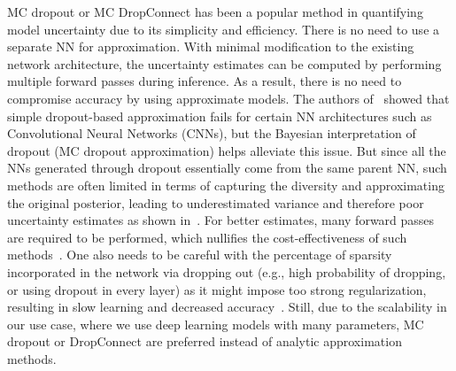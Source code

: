     MC dropout or MC DropConnect has been a popular method in quantifying model uncertainty due to its simplicity and efficiency. There is no need to use a separate NN for approximation. With minimal modification to the existing network architecture, the uncertainty estimates can be computed by performing multiple forward passes during inference. As a result, there is no need to compromise accuracy by using approximate models. The authors of~\cite{BayesCNN} showed that simple dropout-based approximation fails for certain NN architectures such as Convolutional Neural Networks (CNNs), but the Bayesian interpretation of dropout (MC dropout approximation) helps alleviate this issue. But since all the NNs generated through dropout essentially come from the same parent NN, such methods are often limited in terms of capturing the diversity and approximating the original posterior, leading to underestimated variance and therefore poor uncertainty estimates as shown in~\cite{DropoutIssues1, DropoutIssues2}. For better estimates, many forward passes are required to be performed, which nullifies the cost-effectiveness of such methods~\cite{BayesCNN}. One also needs to be careful with the percentage of sparsity incorporated in the network via dropping out (e.g., high probability of dropping, or using dropout in every layer) as it might impose too strong regularization, resulting in slow learning and decreased accuracy~\cite{BayesSegNetUnc}. Still, due to the scalability in our use case, where we use deep learning models with many parameters, MC dropout or DropConnect are preferred instead of analytic approximation methods.
    


